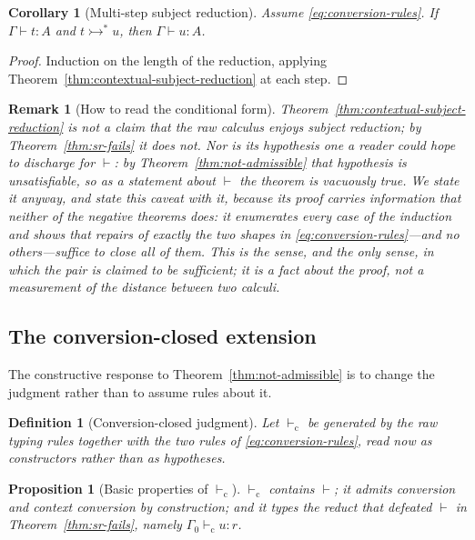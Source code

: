 \documentclass[10pt,reqno]{amsart}
\newtheorem{proposition}[theorem]{Proposition}
\newtheorem{corollary}[theorem]{Corollary}
\newtheorem{definition}[theorem]{Definition}
\newtheorem{remark}[theorem]{Remark}
\newcommand{\vdashC}{\vdash_{\mathrm{c}}}
\newcommand{\ctxredstar}{\mathrel{\rightarrowtail^{*}}}
\begin{document}
\begin{corollary}[Multi-step subject reduction]
\label{cor:multistep-subject-reduction}
Assume \eqref{eq:conversion-rules}.  If \(\Gamma\vdash t:A\) and
\(t\ctxredstar{}u\), then \(\Gamma\vdash u:A\).
\end{corollary}

\begin{proof}
Induction on the length of the reduction, applying
Theorem~\ref{thm:contextual-subject-reduction} at each step.
\end{proof}

\begin{remark}[How to read the conditional form]
\label{rem:conditional-value}
Theorem~\ref{thm:contextual-subject-reduction} is not a claim that the raw
calculus enjoys subject reduction; by Theorem~\ref{thm:sr-fails} it does not.
Nor is its hypothesis one a reader could hope to discharge for \(\vdash\): by
Theorem~\ref{thm:not-admissible} that hypothesis is unsatisfiable, so as a
statement \emph{about} \(\vdash\) the theorem is vacuously true.  We state it
anyway, and state this caveat with it, because its proof carries information
that neither of the negative theorems does: it enumerates every case of the
induction and shows that repairs of exactly the two shapes in
\eqref{eq:conversion-rules}---and no others---suffice to close all of them.
This is the sense, and the only sense, in which the pair is claimed to be
sufficient; it is a fact about the proof, not a measurement of the distance
between two calculi.
\end{remark}

\subsection{The conversion-closed extension}
\label{subsec:conversion-closed}

The constructive response to Theorem~\ref{thm:not-admissible} is to change the
judgment rather than to assume rules about it.

\begin{definition}[Conversion-closed judgment]
\label{def:vdashC}
Let \(\vdashC\) be generated by the raw typing rules together with the two
rules of \eqref{eq:conversion-rules}, read now as constructors rather than as
hypotheses.
\end{definition}

\begin{proposition}[Basic properties of \(\vdashC\)]
\label{prop:vdashC}
\(\vdashC\) contains \(\vdash\); it admits conversion and context conversion by
construction; and it types the reduct that defeated \(\vdash\) in
Theorem~\ref{thm:sr-fails}, namely \(\Gamma_0\vdashC u:r\).
\end{proposition}
\end{document}
